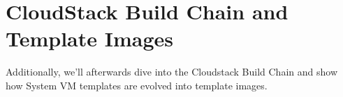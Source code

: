 \section{CloudStack Build Chain and Template Images} 
Additionally, we'll afterwards dive into the Cloudstack Build Chain and show how System VM templates are evolved into template images.
